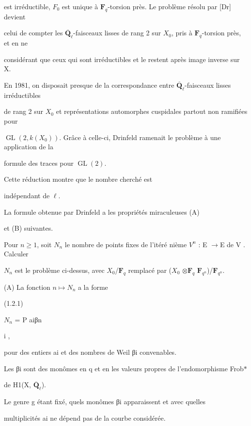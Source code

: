 \documentclass[11pt]{article}
\begin{document}
\noindent est irréductible, \(F_0\) est unique à \(\mathbf F_q\)-torsion près. Le problème résolu par [Dr] devient\par
\noindent celui de compter les \(\overline{\mathbf Q}_{\ell}\)-faisceaux lisses de rang 2 sur \(X_0\), pris à \(\mathbf F_q\)-torsion près, et en ne\par
\noindent considérant que ceux qui sont irréductibles et le restent après image inverse sur X.\par
\noindent En 1981, on disposait presque de la correspondance entre \(\overline{\mathbf Q}_{\ell}\)-faisceaux lisses irréductibles\par
\noindent de rang 2 sur \(X_0\) et représentations automorphes cuspidales partout non ramifiées pour\par
\noindent \(\operatorname{GL}(2,k(X_0))\). Grâce à celle-ci, Drinfeld ramenait le problème à une application de la\par
\noindent formule des traces pour \(\operatorname{GL}(2)\).\par
\noindent Cette réduction montre que le nombre cherché est\par
\noindent indépendant de \(\ell\).\par
\noindent La formule obtenue par Drinfeld a les propriétés miraculeuses (A)\par
\noindent et (B) suivantes.\par
\noindent Pour \(n\geq 1\), soit \(N_n\) le nombre de points fixes de l’itéré nième \(V^n\) : E \(\to\)E de V . Calculer\par
\noindent \(N_n\) est le problème ci-dessus, avec \(X_0\)/\(\mathbf F_q\) remplacé par (\(X_0\) \(\otimes\)\(\mathbf F_q\) \(\mathbf F_{q^n}\))/\(\mathbf F_{q^n}\).\par
\noindent (A) La fonction \(n\mapsto N_n\) a la forme\par
\noindent (1.2.1)\par
\noindent \(N_n\) = P aiβn\par
\noindent i ,\par
\noindent pour des entiers ai et des nombres de Weil βi convenables.\par
\noindent Les βi sont des monômes en q et en les valeurs propres de l’endomorphisme Frob\(*\)\par
\noindent de H1(X, \(\overline{\mathbf Q}_{\ell}\)).\par
\noindent Le genre g étant fixé, quels monômes βi apparaissent et avec quelles\par
\noindent multiplicités ai ne dépend pas de la courbe considérée.\par
\end{document}
